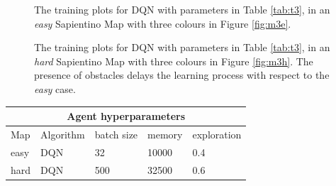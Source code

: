 \documentclass{article}
\begin{document}
\begin{figure}[h!]
  \centering
  \hfill
  \caption{The training plots for DQN with parameters in Table \ref{tab:t3}, in an \textit{easy} Sapientino Map with three colours in Figure \ref{fig:m3e}.}\label{fig:p3e}
\end{figure}
\begin{figure}[h!]
  \centering
  \hfill
  \caption{The training plots for DQN with parameters in Table \ref{tab:t3}, in an \textit{hard} Sapientino Map with three colours in Figure \ref{fig:m3h}. The presence of obstacles delays the learning process with respect to the \textit{easy} case.}\label{fig:p3h}
\end{figure}
\begin{table}[h]
\centering
\begin{tabular}{|p{1cm}|p{2cm}|p{1cm}|p{1.2cm}|p{1.7cm}||}
 \hline
 \multicolumn{5}{|c|}{Agent hyperparameters} \\
 \hline
 Map & Algorithm & batch size & memory & exploration \\
 \hline
 easy & DQN & 32 & 10000 & 0.4 \\
  \hline
  hard & DQN & 500 & 32500 & 0.6 \\
\hline
\end{tabular}
\end{table}
\end{document}
